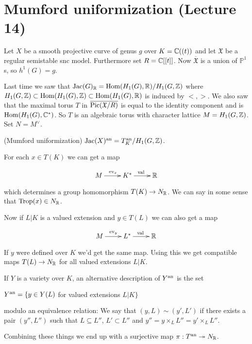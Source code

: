 \section{ Mumford uniformization (Lecture 14)}

\noindent Let $X$ be a smooth projective curve of genus $g$ over $K=\mathbb{C}((t))$ and let $\mathfrak{X}$ be a regular semistable snc model. Furthermore set $R = \mathbb{C}[[t]]$. Now $\overline{\mathfrak{X}}$ is a union of $\mathbb{P}^1$ s, so $h^1(G) = g$.

Last time we saw that $\mathrm{Jac}(G)_{\mathbb{R}} = \mathrm{Hom}(H_1(G),\mathbb{R})/H_1(G,\mathbb{Z})$ where $H_1(G,\mathbb{Z})\subset \mathrm{Hom}(H_1(G),\mathbb{Z})\subset \mathrm{Hom}(H_1(G),\mathbb{R})$ is induced by $<,>$. We also saw that the maximal torus $T$ in $\overline{\mathrm{Pic}(\mathfrak{X}/R)}$ is equal to the identity component and is $\mathrm{Hom}(H_1(G),\mathbb{C}^*)$. So $T$ is an algebraic torus with character lattice $M = H_1(G,\mathbb{Z})$. Set $N=M^{\vee}$.

\begin{theorem} (Mumford uniformization) $\mathrm{Jac}(X)^{\mathrm{an}} = T_K^{\mathrm{an}}/H_1(G,\mathbb{Z})$. \end{theorem}

\noindent For each $x\in T(K)$ we can get a map 

\[
\xymatrix{
M \ar[r]^{\mathrm{ev}_{x}} & K^*  \ar[r]^{\val} & \RR \\
}
\]

which determines a group homomorphism $T(K)\to N_{\mathbb{R}}$. We can say in some sense that $\mathrm{Trop}(x)\in N_{\mathbb{R}}$.

\noindent Now if $L|K$ is a valued extension and $y\in T(L)$ we can also get a map

\[
\xymatrix{
M \ar[r]^{\mathrm{ev}_{y}} & L^*  \ar[r]^{\mathrm{val}} & \RR \\
}
\]

\noindent If $y$ were defined over $K$ we'd get the same map. Using this we get compatible maps $T(L)\to N_{\mathbb{R}}$ for all valued extensions $L|K$.

\noindent If $Y$ is a variety over $K$, an alternative description of $Y^{\mathrm{an}}$ is the set

$Y^{\mathrm{an}}=\{y\in Y(L)$ for valued extensions $L|K \}$

modulo an equivalence relation: We say that $(y,L)\sim (y',L')$ if there exists a pair $(y'',L'')$ such that $L\subseteq L''$, $L'\subset L''$ and $y''=y\times_{L} L'' = y'\times_L L''$.

\noindent Combining these things we end up with a surjective map $\pi: T^{\mathrm{an}}\twoheadrightarrow N_{\mathbb{R}}$.

